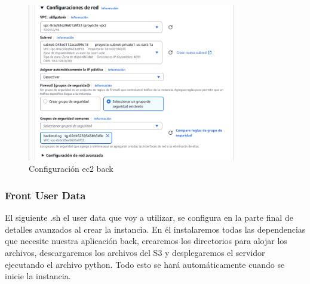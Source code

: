 \documentclass{article}
\begin{document}
			
	\begin{figure}[H]
	\centering
	\includegraphics[width=0.82\textwidth]{configuracion_ec2_back.png}
	\caption{Configuración ec2 back}
	\end{figure}

	\subsubsection{Front User Data}
	El siguiente .sh el user data que voy a utilizar, se configura en la parte final de detalles avanzados al crear la instancia. En él instalaremos todas las dependencias que necesite nuestra aplicación back, crearemos los directorios para alojar los archivos, descargaremos los archivos del S3 y desplegaremos el servidor ejecutando el archivo python. Todo esto se hará automáticamente cuando se inicie la instancia. 
\end{document}
